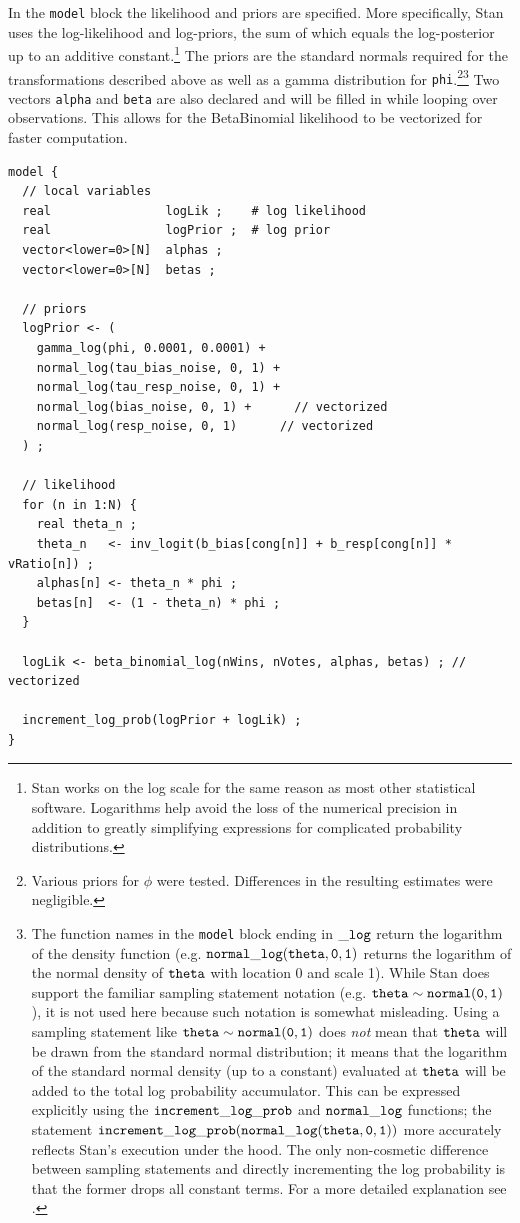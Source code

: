 In the {\tt model} block the likelihood and priors are specified. More specifically, Stan uses the log-likelihood and log-priors, the sum of which equals the log-posterior up to an additive constant.\footnote{Stan works on the log scale for the same reason as most other statistical software. Logarithms help avoid the loss of the numerical precision in addition to greatly simplifying expressions for complicated probability distributions.}
The priors are the standard normals required for the transformations described above as well as a gamma distribution for {\tt phi}.\footnote{Various priors for $\phi$ were tested. Differences in the resulting estimates were negligible.}\footnote{The function names in the {\tt model} block ending in ${\tt\_log}$ return the logarithm of the density function (e.g. ${\tt normal\_log(theta,0,1)}$ returns the logarithm of the normal density of ${\tt theta}$  with location 0 and scale 1). While Stan does support the familiar sampling statement notation (e.g. ${\tt theta \sim normal(0,1)}$), it is not used here because such notation is somewhat misleading. Using a sampling statement like ${\tt theta \sim normal(0,1)}$ does {\it not} mean that ${\tt theta}$ will be drawn from the standard normal distribution; it means that the logarithm of the standard normal density (up to a constant) evaluated at ${\tt theta}$ will be added to the total log probability accumulator. This can be expressed explicitly using the ${\tt increment\_log\_prob}$ and ${\tt normal\_log}$ functions; the statement ${\tt increment\_log\_prob(normal\_log(theta,0,1))}$ more accurately reflects Stan's execution under the hood. The only non-cosmetic difference between sampling statements and directly incrementing the log probability is that the former drops all constant terms. For a more detailed explanation see .} Two vectors {\tt alpha} and {\tt beta} are also declared and will be filled in while looping over observations. This allows for the BetaBinomial likelihood to be vectorized for faster computation.

\begin{singlespacing}
\small
\begin{verbatim}
model {
  // local variables
  real                logLik ;    # log likelihood
  real                logPrior ;  # log prior
  vector<lower=0>[N]  alphas ;
  vector<lower=0>[N]  betas ;

  // priors
  logPrior <- (
    gamma_log(phi, 0.0001, 0.0001) +
    normal_log(tau_bias_noise, 0, 1) +
    normal_log(tau_resp_noise, 0, 1) +
    normal_log(bias_noise, 0, 1) +  	// vectorized
    normal_log(resp_noise, 0, 1)  	  // vectorized
  ) ;

  // likelihood
  for (n in 1:N) {
    real theta_n ;
    theta_n   <- inv_logit(b_bias[cong[n]] + b_resp[cong[n]] * vRatio[n]) ;
    alphas[n] <- theta_n * phi ;
    betas[n]  <- (1 - theta_n) * phi ;
  }
  
  logLik <- beta_binomial_log(nWins, nVotes, alphas, betas) ; // vectorized

  increment_log_prob(logPrior + logLik) ; 
}
\end{verbatim}
\end{singlespacing}

